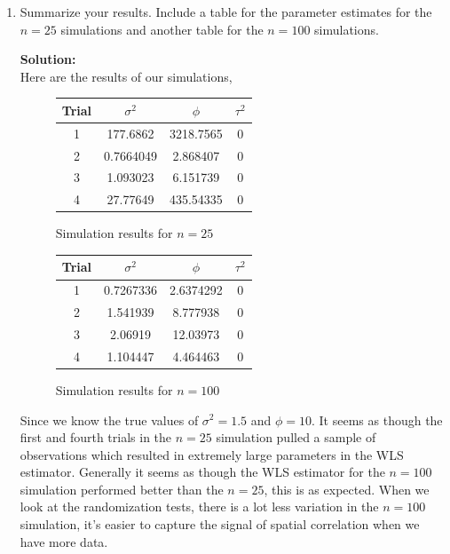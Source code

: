 \documentclass[12pt]{article}
\makeatletter
\theoremstyle{homework}
\newenvironment{exercise}[1]
{\def\@currentlabel{#1}\exercisecore}
{\endexercisecore}
\newcommand{\localhead}[1]{\par\smallskip\noindent\textbf{#1}\nobreak\\}%
\newcommand\solution{\localhead{Solution:}}
\makeatother
\begin{document}
\begin{exercise}{5}
\begin{enumerate}
  
  \item Summarize your results. Include a table for the parameter estimates for the $n=25$
  simulations and another table for the $n=100$ simulations.\\
  \solution Here are the results of our simulations, 
  \begin{figure}[H]
  \begin{center}
    \caption{Simulation results for $n = 25$}
    \begin{tabular}{|c||c|c|c| }
      \hline
      Trial & $\sigma^2$ & $\phi$ & $\tau^2$\\
      \hline 
      \hline
      1& 177.6862  & 3218.7565 &0\\
      2& 0.7664049 &  2.868407 &0\\ 
      3& 1.093023  & 6.151739 &0\\
      4& 27.77649  & 435.54335 &0\\
      \hline
     \end{tabular}
  \end{center}
\end{figure}

  \begin{figure}[H]
  \begin{center}
    \caption{Simulation results for $n = 100$}
    \begin{tabular}{|c||c|c|c| }
      \hline
      Trial & $\sigma^2$ & $\phi$ & $\tau^2$\\
      \hline 
      \hline
      1& 0.7267336 & 2.6374292  &0\\
      2& 1.541939  &  8.777938  &0\\ 
      3& 2.06919   &  12.03973 &0\\
      4& 1.104447  &  4.464463  &0\\
      \hline
     \end{tabular}
  \end{center}
\end{figure}
Since we know the true values of $\sigma^2 = 1.5$ and $\phi = 10$. It seems as though the first 
and fourth trials in the $n = 25$ simulation pulled a sample of observations which resulted in extremely large parameters in the 
WLS estimator. Generally it seems as though the WLS estimator for the $n = 100$ simulation performed better than the $n = 25$, this is 
as expected. When we look at the randomization tests, there is a lot less variation in the $n = 100$ simulation, it's easier to capture
 the signal of spatial correlation when we have more data. 


\end{enumerate}
\end{exercise}
\end{document}
